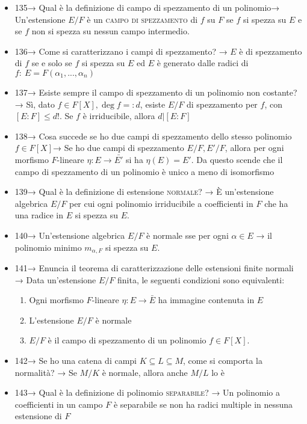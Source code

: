 \documentclass[A4,12pt]{article}
\renewcommand{\subset}{\subseteq}
\begin{document}
\begin{itemize}[noitemsep]
		\item 135→ Qual è la definizione di campo di spezzamento di un polinomio→ Un'estensione $ E/F $ è un \textsc{campo di spezzamento} di $ f $ su $ F $ se $ f $ si spezza su $ E $ e se $ f $ non si spezza su nessun campo intermedio.
		\item 136→ Come si caratterizzano i campi di spezzamento? → $ E $ è di spezzamento di $ f $ se e solo se $ f $ si spezza su $ E $ ed $ E $ è generato dalle radici di $ f:\ E=F(\alpha_1,...,\alpha_n) $
		\item 137→ Esiste sempre il campo di spezzamento di un polinomio non costante? → Sì, dato $ f\in F[X], \deg f=:d $, esiste $ E/F $ di spezzamento per $ f $, con $ [E:F]\leq d! $. Se $ f $ è irriducibile, allora $ d|[E:F] $
		\item 138→ Cosa succede se ho due campi di spezzamento dello stesso polinomio $ f\in F[X] $→ Se ho due campi di spezzamento $ E/F, E'/F $, allora per ogni morfismo $ F $-lineare $ \eta:E\to \bar{E'} $ si ha $ \eta(E) = E' $. Da questo scende che il campo di spezzamento di un polinomio è unico a meno di isomorfismo
		\item 139→ Qual è la definizione di estensione \textsc{normale}? → È un'estensione algebrica $ E/F $ per cui ogni polinomio irriducibile a coefficienti in $ F $ che ha una radice in $ E $ si spezza su $ E $.
		\item 140→ Un'estensione algebrica $ E/F $ è normale sse per ogni $ \alpha \in E $ → il polinomio minimo $ m_{\alpha,F} $ si spezza su $ E $.
		\item 141→ Enuncia il teorema di caratterizzazione delle estensioni finite normali → Data un'estensione $ E/F $ finita, le seguenti condizioni sono equivalenti: \begin{enumerate}
			\item Ogni morfismo $ F $-lineare $ \eta:E\to \bar E $ ha immagine contenuta in $ E $
			\item L'estensione $ E/F $ è normale
			\item $ E/F $ è il campo di spezzamento di un polinomio $ f\in F[X] $.
		\end{enumerate}
		\item 142→ Se ho una catena di campi $ K\subset L\subset M $, come si comporta la normalità? → Se $ M/K $ è normale, allora anche $ M/L $ lo è
		\item 143→ Qual è la definizione di polinomio \textsc{separabile}? → Un polinomio a coefficienti in un campo $ F $ è separabile se non ha radici multiple in nessuna estensione di $ F $

\end{itemize}
\end{document}
